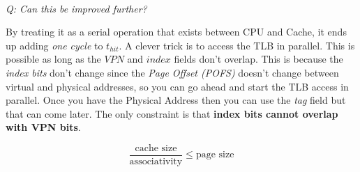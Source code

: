 \documentclass[12pt]{article}
\newenvironment{QandA}{\begin{enumerate}[label=\bfseries\arabic*.]\bfseries}
                      {\end{enumerate}}
\newenvironment{answered}{\par\quad\normalfont}{}
\begin{document}
\begin{QandA}
\begin{answered}
\ 

\textit{Q: Can this be improved further?}  

By treating it as a serial operation that exists between CPU and Cache, it ends up adding \textit{one cycle} to $t_{hit}$. A clever trick is to access the TLB in parallel. This is possible as long as the $VPN$ and $index$ fields don't overlap. This is because the \textit{index bits} don't change since the \textit{Page Offset (POFS)} doesn't change between virtual and physical addresses, so you can go ahead and start the TLB access in parallel. Once you have the Physical Address then you can use the \textit{tag} field but that can come later. The only constraint is that \textbf{index bits cannot overlap with VPN bits}. 

\begin{equation*}
    \frac{\text{cache size}}{\text{associativity}} \leq \text{page size}
\end{equation*}

\end{answered}

\end{QandA}
\end{document}
